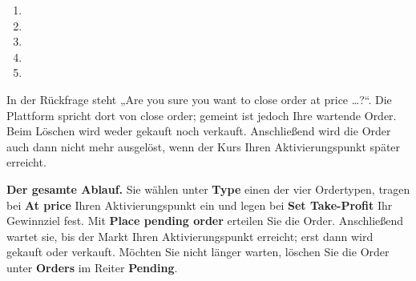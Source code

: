 \documentclass[10pt,a4paper]{article}
\newcommand{\LOESCHSEP}{7mm}%
\begin{document}
\noindent\begin{minipage}{140mm}\flatter
\begin{enumerate}[label=\protect\cn{\arabic*},leftmargin=7mm,labelsep=3mm,itemsep=\LOESCHSEP,topsep=0pt]
\item {}
\item {}
\item {}
\item {}
\item {}
\end{enumerate}\end{minipage}
\hr
{}
\noindent\begin{minipage}{140mm}\color{body}\flatter In der Rückfrage steht „Are you sure you want to close order at price …?“.
Die Plattform spricht dort von close order; gemeint ist jedoch Ihre wartende Order. Beim
Löschen wird weder gekauft noch verkauft. Anschließend wird die Order auch dann nicht mehr
ausgelöst, wenn der Kurs Ihren Aktivierungspunkt später erreicht.\end{minipage}
\par{}
\begin{merk}\textbf{Der gesamte Ablauf.} Sie wählen unter \textbf{Type} einen der vier
Ordertypen, tragen bei \textbf{At price} Ihren Aktivierungspunkt ein und legen bei
\textbf{Set Take-Profit} Ihr Gewinnziel fest. Mit \textbf{Place pending order} erteilen Sie die
Order. Anschließend wartet sie, bis der Markt Ihren Aktivierungspunkt erreicht; erst dann wird
gekauft oder verkauft. Möchten Sie nicht länger warten, löschen Sie die Order unter
\textbf{Orders} im Reiter \textbf{Pending}.\end{merk}
\end{document}
